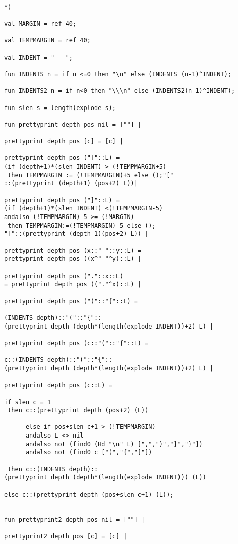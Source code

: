 \documentclass[12pt]{article}
\begin{document}
\begin{verbatim}

*)

val MARGIN = ref 40;

val TEMPMARGIN = ref 40;

val INDENT = "   ";

fun INDENTS n = if n <=0 then "\n" else (INDENTS (n-1)^INDENT);

fun INDENTS2 n = if n<0 then "\\\n" else (INDENTS2(n-1)^INDENT);

fun slen s = length(explode s);

fun prettyprint depth pos nil = [""] |

prettyprint depth pos [c] = [c] |

prettyprint depth pos ("["::L) = 
(if (depth+1)*(slen INDENT) > (!TEMPMARGIN+5)
 then TEMPMARGIN := (!TEMPMARGIN)+5 else ();"[" 
::(prettyprint (depth+1) (pos+2) L))|

prettyprint depth pos ("]"::L) =
(if (depth+1)*(slen INDENT) <(!TEMPMARGIN-5)
andalso (!TEMPMARGIN)-5 >= (!MARGIN)
 then TEMPMARGIN:=(!TEMPMARGIN)-5 else (); 
"]"::(prettyprint (depth-1)(pos+2) L)) |

prettyprint depth pos (x::"_"::y::L) =
prettyprint depth pos ((x^"_"^y)::L) |

prettyprint depth pos ("."::x::L)
= prettyprint depth pos (("."^x)::L) |

prettyprint depth pos ("("::"{"::L) =

(INDENTS depth)::"("::"{"::
(prettyprint depth (depth*(length(explode INDENT))+2) L) |

prettyprint depth pos (c::"("::"{"::L) =

c::(INDENTS depth)::"("::"{"::
(prettyprint depth (depth*(length(explode INDENT))+2) L) |

prettyprint depth pos (c::L) = 

if slen c = 1
 then c::(prettyprint depth (pos+2) (L))

      else if pos+slen c+1 > (!TEMPMARGIN)
	  andalso L <> nil
	  andalso not (find0 (Hd "\n" L) [",",")","]","}"])
	  andalso not (find0 c ["(","{","["])
	  
 then c::(INDENTS depth)::
(prettyprint depth (depth*(length(explode INDENT))) (L))

else c::(prettyprint depth (pos+slen c+1) (L));


fun prettyprint2 depth pos nil = [""] |

prettyprint2 depth pos [c] = [c] |


\end{verbatim}
\end{document}
